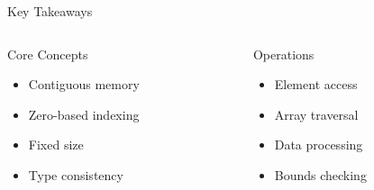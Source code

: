 \documentclass{beamer}
\begin{document}
\begin{frame}{Key Takeaways}
    \begin{columns}[T]
        \begin{column}{0.5\textwidth}
            \begin{block}{Core Concepts}
                \begin{itemize}
                    \item Contiguous memory
                    \item Zero-based indexing
                    \item Fixed size
                    \item Type consistency
                \end{itemize}
            \end{block}
        \end{column}
        \begin{column}{0.5\textwidth}
            \begin{block}{Operations}
                \begin{itemize}
                    \item Element access
                    \item Array traversal
                    \item Data processing
                    \item Bounds checking
                \end{itemize}
            \end{block}
        \end{column}
    \end{columns}
\end{frame}
\end{document}
